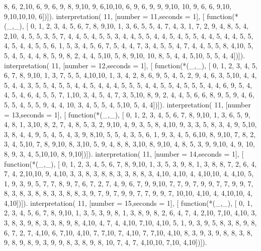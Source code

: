          8, 6, 2,10, 6, 9, 6, 9, 8, 9,10,
         9, 6,10,10, 6, 9, 6, 9, 9, 9,10,
        10, 9, 6, 6, 9,10, 9,10,10,10, 6])]).
interpretation( 11, [number = 11,seconds = 1], [
    function(*(_,_), [
         0, 1, 2, 3, 4, 5, 6, 7, 8, 9,10,
         1, 3, 6, 5, 5, 4, 7, 4, 3, 1, 7,
         2, 9, 4, 8, 5, 4, 2,10, 4, 5, 5,
         3, 5, 7, 4, 4, 5, 4, 5, 5, 3, 4,
         4, 5, 5, 4, 4, 5, 4, 5, 5, 4, 4,
         5, 4, 4, 5, 5, 4, 5, 4, 4, 5, 5,
         6, 1, 5, 3, 4, 5, 6, 7, 5, 4, 4,
         7, 3, 4, 5, 5, 4, 7, 4, 4, 5, 5,
         8, 4,10, 5, 5, 4, 5, 4, 4, 8, 5,
         9, 8, 2, 4, 4, 5,10, 5, 8, 9,10,
        10, 8, 5, 4, 4, 5,10, 5, 5, 4, 4])]).
interpretation( 11, [number = 12,seconds = 1], [
    function(*(_,_), [
         0, 1, 2, 3, 4, 5, 6, 7, 8, 9,10,
         1, 3, 7, 5, 5, 4,10,10, 1, 3, 4,
         2, 8, 6, 9, 5, 4, 5, 2, 9, 4, 6,
         3, 5,10, 4, 4, 5, 4, 4, 3, 5, 5,
         4, 5, 5, 4, 4, 5, 4, 4, 4, 5, 5,
         5, 4, 4, 5, 5, 4, 5, 5, 5, 4, 4,
         6, 9, 5, 4, 4, 5, 4, 6, 4, 5, 5,
         7, 1,10, 3, 4, 5, 4, 7, 3, 5,10,
         8, 9, 2, 4, 4, 5, 6, 6, 8, 9, 5,
         9, 4, 6, 5, 5, 4, 5, 5, 9, 4, 4,
        10, 3, 4, 5, 5, 4, 5,10, 5, 4, 4])]).
interpretation( 11, [number = 13,seconds = 1], [
    function(*(_,_), [
         0, 1, 2, 3, 4, 5, 6, 7, 8, 9,10,
         1, 3, 6, 5, 9, 4, 8, 1, 3,10, 8,
         2, 7, 4, 8, 5, 3, 2, 9,10, 4, 9,
         3, 5, 8, 4,10, 9, 3, 3, 5, 8, 3,
         4, 9, 5,10, 3, 8, 4, 4, 9, 5, 4,
         5, 4, 3, 9, 8,10, 5, 5, 4, 3, 5,
         6, 1, 9, 3, 4, 5, 6,10, 8, 9,10,
         7, 8, 2, 3, 4, 5,10, 7, 8, 9,10,
         8, 3,10, 5, 9, 4, 8, 8, 3,10, 8,
         9,10, 4, 8, 5, 3, 9, 9,10, 4, 9,
        10, 8, 9, 3, 4, 5,10,10, 8, 9,10])]).
interpretation( 11, [number = 14,seconds = 1], [
    function(*(_,_), [
         0, 1, 2, 3, 4, 5, 6, 7, 8, 9,10,
         1, 3, 5, 3, 9, 8, 1, 3, 8, 8, 7,
         2, 6, 4, 7, 4, 2,10,10, 9, 4,10,
         3, 3, 8, 3, 8, 8, 3, 3, 8, 8, 3,
         4,10, 4,10, 4, 4,10,10, 4, 4,10,
         5, 1, 9, 3, 9, 5, 7, 7, 8, 9, 7,
         6, 7, 2, 7, 4, 9, 6, 7, 9, 9,10,
         7, 7, 9, 7, 9, 9, 7, 7, 9, 9, 7,
         8, 3, 8, 3, 8, 8, 3, 3, 8, 8, 3,
         9, 7, 9, 7, 9, 9, 7, 7, 9, 9, 7,
        10,10, 4,10, 4, 4,10,10, 4, 4,10])]).
interpretation( 11, [number = 15,seconds = 1], [
    function(*(_,_), [
         0, 1, 2, 3, 4, 5, 6, 7, 8, 9,10,
         1, 3, 5, 3, 9, 8, 1, 3, 8, 9, 8,
         2, 6, 4, 7, 4, 2,10, 7,10, 4,10,
         3, 3, 8, 3, 9, 8, 3, 3, 8, 9, 8,
         4,10, 4, 7, 4, 4,10, 7,10, 4,10,
         5, 1, 9, 3, 9, 5, 8, 3, 8, 9, 8,
         6, 7, 2, 7, 4,10, 6, 7,10, 4,10,
         7, 7,10, 7, 4,10, 7, 7,10, 4,10,
         8, 3, 9, 3, 9, 8, 8, 3, 8, 9, 8,
         9, 8, 9, 3, 9, 9, 8, 3, 8, 9, 8,
        10, 7, 4, 7, 4,10,10, 7,10, 4,10])]).
